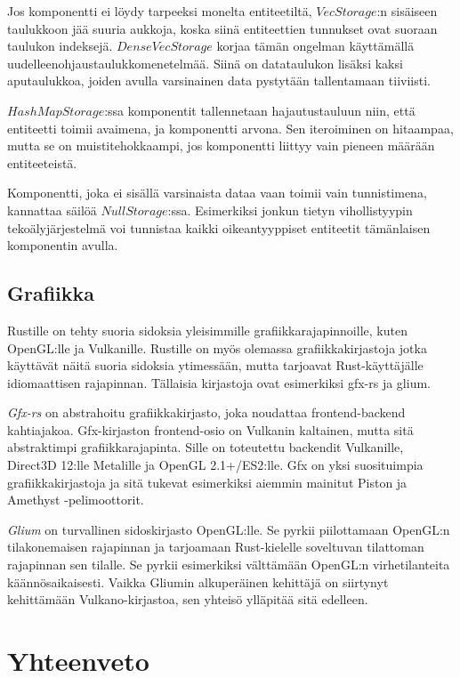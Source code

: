 \documentclass[finnish]{tktltiki2}
\theoremstyle{definition}
\theoremstyle{remark}
\begin{document}
Jos komponentti ei löydy tarpeeksi monelta entiteetiltä, $VecStorage$:n sisäiseen taulukkoon jää suuria aukkoja, koska siinä entiteettien tunnukset ovat suoraan taulukon indeksejä. $DenseVecStorage$ korjaa tämän ongelman käyttämällä uudelleenohjaustaulukkomenetelmää. Siinä on datataulukon lisäksi kaksi aputaulukkoa, joiden avulla varsinainen data pystytään tallentamaan tiiviisti.

$HashMapStorage$:ssa komponentit tallennetaan hajautustauluun niin, että entiteetti toimii avaimena, ja komponentti arvona. Sen iteroiminen on hitaampaa, mutta se on muistitehokkaampi, jos komponentti liittyy vain pieneen määrään entiteeteistä.  

Komponentti, joka ei sisällä varsinaista dataa vaan toimii vain tunnistimena, kannattaa säilöä $NullStorage$:ssa. Esimerkiksi jonkun tietyn vihollistyypin tekoälyjärjestelmä voi tunnistaa kaikki oikeantyyppiset entiteetit tämänlaisen komponentin avulla. 

\subsection{Grafiikka}

Rustille on tehty suoria sidoksia yleisimmille grafiikkarajapinnoille, kuten OpenGL:lle ja Vulkanille. Rustille on myös olemassa grafiikkakirjastoja jotka käyttävät näitä suoria sidoksia ytimessään, mutta tarjoavat Rust-käyttäjälle idiomaattisen rajapinnan. Tällaisia kirjastoja ovat esimerkiksi gfx-rs ja glium.

\textit{Gfx-rs} on abstrahoitu grafiikkakirjasto, joka noudattaa frontend-backend kahtiajakoa. Gfx-kirjaston frontend-osio on Vulkanin kaltainen, mutta sitä abstraktimpi grafiikkarajapinta. Sille on toteutettu backendit Vulkanille, Direct3D 12:lle Metalille ja OpenGL 2.1+/ES2:lle. Gfx on yksi suosituimpia grafiikkakirjastoja ja sitä tukevat esimerkiksi aiemmin mainitut Piston ja Amethyst -pelimoottorit.

\textit{Glium} on turvallinen sidoskirjasto OpenGL:lle. Se pyrkii piilottamaan OpenGL:n tilakonemaisen rajapinnan ja tarjoamaan Rust-kielelle soveltuvan tilattoman rajapinnan sen tilalle. Se pyrkii esimerkiksi välttämään OpenGL:n virhetilanteita käännösaikaisesti. Vaikka Gliumin alkuperäinen kehittäjä on siirtynyt kehittämään Vulkano-kirjastoa, sen yhteisö ylläpitää sitä edelleen.

\section{Yhteenveto}
\end{document}
